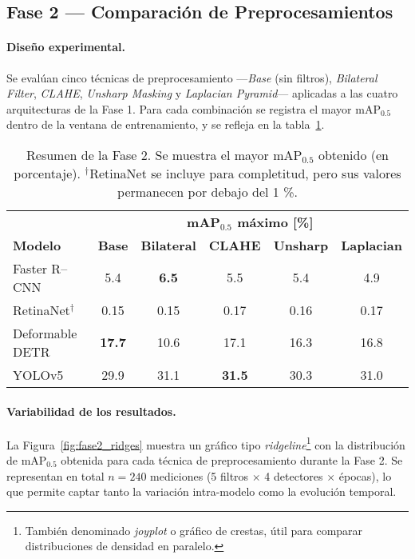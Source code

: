 \subsection{Fase 2 — Comparación de Preprocesamientos}
\label{ssec:fase2}

\paragraph{Diseño experimental.}
Se evalúan cinco técnicas de preprocesamiento —\textit{Base} (sin filtros), \textit{Bilateral Filter}, \textit{CLAHE}, \textit{Unsharp Masking} y \textit{Laplacian Pyramid}— aplicadas a las cuatro arquitecturas de la Fase 1.
Para cada combinación se registra el mayor mAP\(_{0.5}\) dentro de la ventana de entrenamiento, y se refleja en la tabla~\ref{tab:fase2_map}.

\begin{table}[htpb]
  \centering
  \begin{tabular}{lccccc}
    \hline
                     & \multicolumn{5}{c}{\textbf{mAP\(_{0.5}\) máximo [\%]}}\\
    \cline{2-6}
    \textbf{Modelo}  & \textbf{Base} & \textbf{Bilateral} & \textbf{CLAHE} & \textbf{Unsharp} & \textbf{Laplacian}\\
    \hline
    Faster R–CNN         & 5.4  & \textbf{6.5} & 5.5  & 5.4  & 4.9  \\
    RetinaNet$^\dagger$  & 0.15 & 0.15         & 0.17 & 0.16 & 0.17 \\
    Deformable DETR      & \textbf{17.7} & 10.6 & 17.1 & 16.3 & 16.8 \\
    YOLOv5               & 29.9 & 31.1 & \textbf{31.5} & 30.3 & 31.0 \\
    \hline
  \end{tabular}
  \caption[Mejor mAP por técnica de preprocesamiento]{Resumen de la Fase 2. Se muestra el mayor mAP\(_{0.5}\) obtenido (en porcentaje). $^\dagger$RetinaNet se incluye para completitud, pero sus valores permanecen por debajo del 1 \%.}
  \label{tab:fase2_map}
\end{table}


\paragraph{Variabilidad de los resultados.}
La Figura~\ref{fig:fase2_ridges} muestra un gráfico tipo \emph{ridgeline}\footnote{También denominado \emph{joyplot} o gráfico de crestas, útil para comparar distribuciones de densidad en paralelo.} con la distribución de mAP\(_{0.5}\) obtenida para cada técnica de preprocesamiento durante la Fase 2.
Se representan en total \(n=240\) mediciones (5 filtros \(\times\) 4 detectores \(\times\) épocas), lo que permite captar tanto la variación intra-modelo como la evolución temporal.

